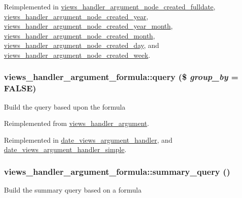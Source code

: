 Reimplemented in \hyperlink{classviews__handler__argument__node__created__fulldate_af5b74c0204c9da9285cbe3e07ebed345}{views\_\-handler\_\-argument\_\-node\_\-created\_\-fulldate}, \hyperlink{classviews__handler__argument__node__created__year_aa40b34ab0d297264f7378fc995e06bc7}{views\_\-handler\_\-argument\_\-node\_\-created\_\-year}, \hyperlink{classviews__handler__argument__node__created__year__month_a9e090c0caf0a169fe3f9a78160896d01}{views\_\-handler\_\-argument\_\-node\_\-created\_\-year\_\-month}, \hyperlink{classviews__handler__argument__node__created__month_a0f9b4da1f37a58ca3e416667dc8d9bbb}{views\_\-handler\_\-argument\_\-node\_\-created\_\-month}, \hyperlink{classviews__handler__argument__node__created__day_aeb33813a3cc0da642e45a12625da5bde}{views\_\-handler\_\-argument\_\-node\_\-created\_\-day}, and \hyperlink{classviews__handler__argument__node__created__week_ae90c3f8a723cfa081198075d2fe67c52}{views\_\-handler\_\-argument\_\-node\_\-created\_\-week}.\hypertarget{classviews__handler__argument__formula_aa8108173e62c8c7dfb17e734dce537b5}{
\subsubsection[{query}]{\setlength{\rightskip}{0pt plus 5cm}views\_\-handler\_\-argument\_\-formula::query (\$ {\em group\_\-by} = {\ttfamily FALSE})}}
\label{classviews__handler__argument__formula_aa8108173e62c8c7dfb17e734dce537b5}
Build the query based upon the formula 

Reimplemented from \hyperlink{classviews__handler__argument_af9ddabf5d386782c8ffc5785b7ae4263}{views\_\-handler\_\-argument}.

Reimplemented in \hyperlink{classdate__views__argument__handler_aa7df86c9e200ef7e797e1ba4f2fa1158}{date\_\-views\_\-argument\_\-handler}, and \hyperlink{classdate__views__argument__handler__simple_a284da1e34334bd9086194eef7a803d27}{date\_\-views\_\-argument\_\-handler\_\-simple}.\hypertarget{classviews__handler__argument__formula_a377fd11d178f88a0bd68c2ec9d6f9e00}{
\subsubsection[{summary\_\-query}]{\setlength{\rightskip}{0pt plus 5cm}views\_\-handler\_\-argument\_\-formula::summary\_\-query ()}}
\label{classviews__handler__argument__formula_a377fd11d178f88a0bd68c2ec9d6f9e00}
Build the summary query based on a formula 

